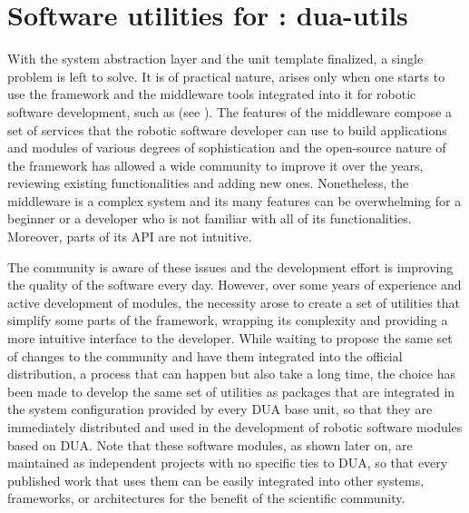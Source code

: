 \section{Software utilities for \ROS: dua-utils}
\label{sec:dua-utils}
With the system abstraction layer and the unit template finalized, a single problem is left to solve. It is of practical nature, arises only when one starts to use the framework and the middleware tools integrated into it for robotic software development, such as \ROS (see ). The features of the \ROS middleware compose a set of services that the robotic software developer can use to build applications and modules of various degrees of sophistication and the open-source nature of the framework has allowed a wide community to improve it over the years, reviewing existing functionalities and adding new ones. Nonetheless, the \ROS middleware is a complex system and its many features can be overwhelming for a beginner or a developer who is not familiar with all of its functionalities. Moreover, parts of its API are not intuitive.

The \ROS community is aware of these issues and the development effort is improving the quality of the software every day. However, over some years of experience and active development of \ROS modules, the necessity arose to create a set of utilities that simplify some parts of the framework, wrapping its complexity and providing a more intuitive interface to the developer. While waiting to propose the same set of changes to the community and have them integrated into the official \ROS distribution, a process that can happen but also take a long time, the choice has been made to develop the same set of utilities as packages that are integrated in the system configuration provided by every DUA base unit, so that they are immediately distributed and used in the development of robotic software modules based on DUA. Note that these software modules, as shown later on, are maintained as independent projects with no specific ties to DUA, so that every published work that uses them can be easily integrated into other systems, frameworks, or architectures for the benefit of the scientific community.

